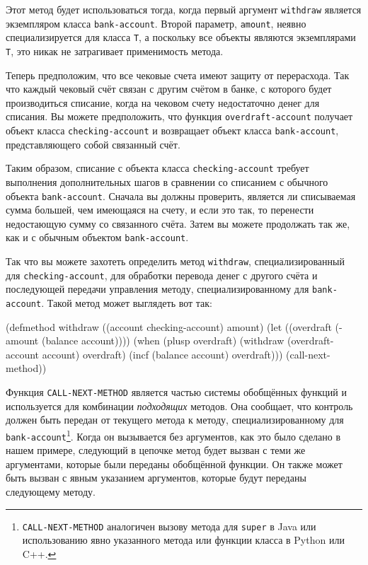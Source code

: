 Этот метод будет использоваться тогда, когда первый аргумент \lstinline{withdraw} является
экземпляром класса \lstinline{bank-account}.  Второй параметр, \lstinline{amount}, неявно
специализируется для класса \lstinline{T}, а поскольку все объекты являются экземплярами
\lstinline{T}, это никак не затрагивает применимость метода.

Теперь предположим, что все чековые счета имеют защиту от перерасхода.  Так что каждый
чековый счёт связан с другим счётом в банке, с которого будет производиться списание,
когда на чековом счету недостаточно денег для списания.  Вы можете предположить, что
функция \lstinline{overdraft-account} получает объект класса \lstinline{checking-account} и
возвращает объект класса \lstinline{bank-account}, представляющего собой связанный счёт.

Таким образом, списание с объекта класса \lstinline{checking-account} требует выполнения
дополнительных шагов в сравнении со списанием с обычного объекта \lstinline{bank-account}.
Сначала вы должны проверить, является ли списываемая сумма большей, чем имеющаяся на
счету, и если это так, то перенести недостающую сумму со связанного счёта.  Затем вы
можете продолжать так же, как и с обычным объектом \lstinline{bank-account}.

Так что вы можете захотеть определить метод \lstinline{withdraw}, специализированный для
\lstinline{checking-account}, для обработки перевода денег с другого счёта и последующей
передачи управления методу, специализированному для \lstinline{bank-account}.  Такой метод
может выглядеть вот так:

\begin{myverb}
(defmethod withdraw ((account checking-account) amount)
  (let ((overdraft (- amount (balance account))))
    (when (plusp overdraft)
      (withdraw (overdraft-account account) overdraft)
      (incf (balance account) overdraft)))
  (call-next-method))
\end{myverb}

Функция \lstinline{CALL-NEXT-METHOD} является частью системы обобщённых функций и используется
для комбинации \textit{подходящих} методов.  Она сообщает, что контроль должен быть
передан от текущего метода к методу, специализированному для
\lstinline{bank-account}\footnote{\lstinline{CALL-NEXT-METHOD} аналогичен вызову метода для
  \lstinline{super} в Java или использованию явно указанного метода или функции класса в Python
  или C++.}.  Когда он вызывается без аргументов, как это было сделано в нашем примере,
следующий в цепочке метод будет вызван с теми же аргументами, которые были переданы
обобщённой функции.  Он также может быть вызван с явным указанием аргументов, которые
будут переданы следующему методу.

